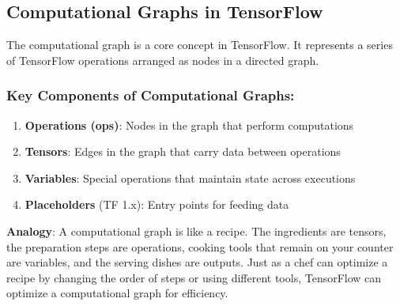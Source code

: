 \documentclass[
  letterpaper,
  DIV=11,
  numbers=noendperiod]{scrreprt}
\providecommand{\tightlist}{%
  \setlength{\itemsep}{0pt}\setlength{\parskip}{0pt}}\usepackage{longtable,booktabs,array}
\begin{document}
\subsection{Computational Graphs in
TensorFlow}\label{computational-graphs-in-tensorflow}

The computational graph is a core concept in TensorFlow. It represents a
series of TensorFlow operations arranged as nodes in a directed graph.

\subsubsection{Key Components of Computational
Graphs:}\label{key-components-of-computational-graphs}

\begin{enumerate}
\def\labelenumi{\arabic{enumi}.}
\tightlist
\item
  \textbf{Operations (ops)}: Nodes in the graph that perform
  computations
\item
  \textbf{Tensors}: Edges in the graph that carry data between
  operations
\item
  \textbf{Variables}: Special operations that maintain state across
  executions
\item
  \textbf{Placeholders} (TF 1.x): Entry points for feeding data
\end{enumerate}

\textbf{Analogy}: A computational graph is like a recipe. The
ingredients are tensors, the preparation steps are operations, cooking
tools that remain on your counter are variables, and the serving dishes
are outputs. Just as a chef can optimize a recipe by changing the order
of steps or using different tools, TensorFlow can optimize a
computational graph for efficiency.
\end{document}
